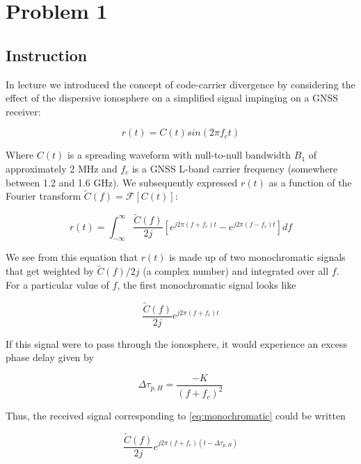 \section{Problem 1}

\subsection{Instruction}

In lecture we introduced the concept of code-carrier divergence by considering
the effect of the dispersive ionosphere on a simplified signal impinging on a
GNSS receiver:

\begin{equation}
	r(t) = C(t) sin(2 \pi f_c t)
\end{equation}

Where $C(t)$ is a spreading waveform with null-to-null bandwidth $B_1$ of
approximately 2 MHz and $f_c$ is a GNSS L-band carrier frequency (somewhere
between 1.2 and 1.6 GHz). We subsequently expressed $r(t)$ as a function of the
Fourier transform $\tilde{C}(f) = \mathcal{F}[C(t)]$:

\begin{equation}
	r(t) = \int_{-\infty}^{\infty} \frac{\tilde{C}(f)}{2j} [ e^{j 2 \pi (f + f_c) t}
		- e^{j 2 \pi (f - f_c) t}] df
	\label{eq:r_signal}
\end{equation}

We see from this equation that $r(t)$ is made up of two monochromatic signals
that get weighted by $\tilde{C}(f)/2j$ (a complex number) and integrated over
all $f$. For a particular value of $f$, the first monochromatic signal looks
like

\begin{equation}
	\frac{\tilde{C}(f)}{2j} e^{j 2 \pi (f + f_c) t}
	\label{eq:monochromatic}
\end{equation}

If this signal were to pass through the ionosphere, it would experience an
excess phase delay given by

\begin{equation}
	\Delta \tau_{p,H} = \frac{-K}{(f + f_c)^2}
\end{equation}

Thus, the received signal corresponding to \ref{eq:monochromatic} could be written

\begin{equation}
	\frac{\tilde{C}(f)}{2j} e^{j 2 \pi (f + f_c) (t - \Delta \tau_{p,H})}
\end{equation}

